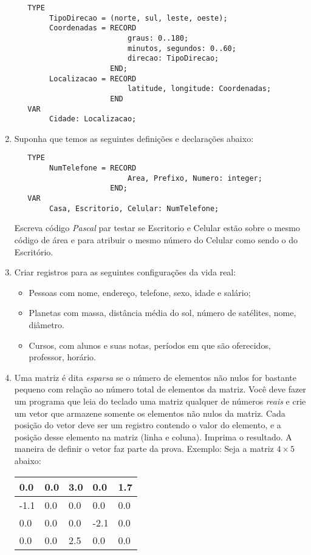 \begin{enumerate}
\begin{verbatim}
   TYPE 
        TipoDirecao = (norte, sul, leste, oeste);
        Coordenadas = RECORD
                          graus: 0..180;
                          minutos, segundos: 0..60;
                          direcao: TipoDirecao;
                      END;
        Localizacao = RECORD
                          latitude, longitude: Coordenadas;
                      END
   VAR
        Cidade: Localizacao;
\end{verbatim}

\item Suponha que temos as seguintes definições e declarações abaixo:

\begin{verbatim}
   TYPE 
        NumTelefone = RECORD
                          Area, Prefixo, Numero: integer;
                      END;
   VAR
        Casa, Escritorio, Celular: NumTelefone;
\end{verbatim}

   Escreva código \emph{Pascal} par testar  se Escritorio e Celular estão sobre
   o mesmo código de área e para atribuir o mesmo número do Celular como
   sendo o do Escritório.

\item Criar registros para as seguintes configurações da vida real:
\begin{itemize}
  \item Pessoas com nome, endereço, telefone, sexo, idade e salário;
   \item Planetas  com massa, distância  média do sol, número  de satélites,
     nome, diâmetro. 
   \item Cursos,  com alunos e suas  notas, períodos em  que são oferecidos,
     professor, horário.
\end{itemize}

\item Uma matriz é dita \textit{esparsa} se o 
número de elementos não nulos for bastante pequeno com relação
ao número total de elementos da matriz. Você deve fazer um programa
que leia do teclado uma matriz qualquer de números \textit{reais} e crie um 
vetor que armazene somente os elementos não nulos da matriz. Cada
posição do vetor deve ser um registro contendo o valor do elemento,
e a posição desse elemento na matriz (linha e coluna).
Imprima o resultado. A maneira de definir o vetor faz parte da prova.
Exemplo:
Seja a matriz $4 \times 5$ abaixo:

\begin{center}
\begin{tabular}{|l|l|l|l|l|}  \hline
0.0  & 0.0 & 3.0 & 0.0  & 1.7 \\ \hline
-1.1 & 0.0 & 0.0 & 0.0  & 0.0 \\ \hline
0.0  & 0.0 & 0.0 & -2.1 & 0.0 \\ \hline
0.0  & 0.0 & 2.5 & 0.0  & 0.0 \\ \hline
\end{tabular}
\end{center}


\end{enumerate}
